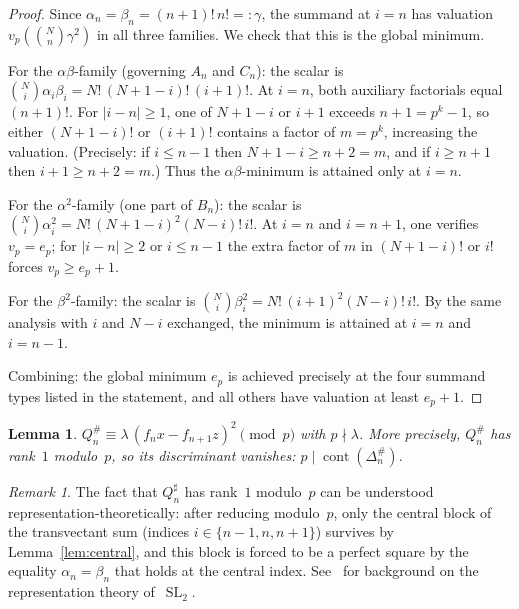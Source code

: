 \documentclass[10pt]{amsart}
\newtheorem{lemma}[theorem]{Lemma}
\theoremstyle{definition}
\theoremstyle{remark}
\newtheorem*{remark}{Remark}
\DeclareMathOperator{\cont}{cont}
\DeclareMathOperator{\SL}{SL}
\begin{document}
\begin{proof}
Since $\alpha_n = \beta_n = (n+1)!\,n! =: \gamma$, the summand at $i = n$ has
valuation $v_p(\binom{N}{n}\gamma^2)$ in all three families.  We check that
this is the global minimum.

For the $\alpha\beta$-family (governing $A_n$ and $C_n$): the scalar is
$\binom{N}{i}\alpha_i\beta_i = N!\,(N+1-i)!\,(i+1)!$.  At $i = n$, both
auxiliary factorials equal $(n+1)!$.  For $|i-n| \ge 1$, one of
$N+1-i$ or $i+1$ exceeds $n+1 = p^k-1$, so either $(N+1-i)!$ or
$(i+1)!$ contains a factor of $m = p^k$, increasing the valuation.
(Precisely: if $i \le n-1$ then $N+1-i \ge n+2 = m$, and if
$i \ge n+1$ then $i+1 \ge n+2 = m$.)  Thus the $\alpha\beta$-minimum
is attained only at $i = n$.

For the $\alpha^2$-family (one part of $B_n$): the scalar is
$\binom{N}{i}\alpha_i^2 = N!\,(N+1-i)^2(N-i)!\,i!$.  At $i = n$
and $i = n+1$, one verifies $v_p = e_p$; for $|i-n| \ge 2$ or $i \le n-1$
the extra factor of $m$ in $(N+1-i)!$ or $i!$ forces $v_p \ge e_p + 1$.

For the $\beta^2$-family: the scalar is
$\binom{N}{i}\beta_i^2 = N!\,(i+1)^2(N-i)!\,i!$.  By the same analysis
with $i$ and $N-i$ exchanged, the minimum is attained at $i = n$ and $i = n-1$.

Combining: the global minimum $e_p$ is achieved precisely at the four
summand types listed in the statement, and all others have valuation at
least $e_p + 1$.
\end{proof}

\begin{lemma}\label{lem:rank1}
$Q_n^{\#} \equiv \lambda\,(f_n x - f_{n+1}z)^2 \pmod{p}$ with
$p \nmid \lambda$.  More precisely, $Q_n^{\#}$ has rank~$1$
modulo~$p$, so its discriminant vanishes:
$p \mid \cont(\Delta_n^{\#})$.
\end{lemma}

\begin{remark}
The fact that $Q_n^\sharp$ has rank~$1$ modulo~$p$ can be understood
representation-theoretically: after reducing modulo~$p$, only the central
block of the transvectant sum (indices $i \in \{n-1, n, n+1\}$)
survives by Lemma~\ref{lem:central}, and this block is forced to be a
perfect square by the equality $\alpha_n = \beta_n$ that holds at the
central index.  See~\cite{FultonHarris1991} for background on the
representation theory of~$\SL_2$.
\end{remark}
\end{document}
